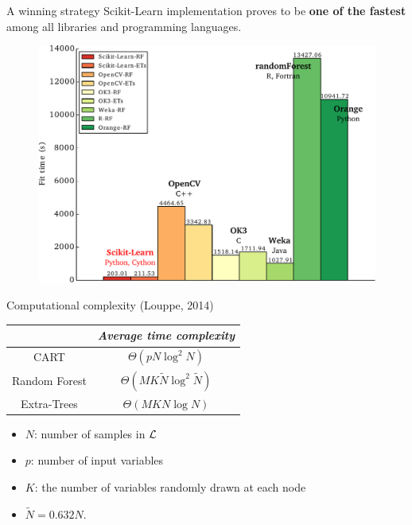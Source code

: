 \documentclass{beamer}
\begin{document}
\begin{frame}{A winning strategy}
Scikit-Learn implementation proves to be {\bf one of the fastest} among all libraries and programming languages.
  \begin{figure}
  \includegraphics[scale=0.5]{./figures/bench.pdf}
  \end{figure}
\end{frame}


\begin{frame}{Computational complexity {\scriptsize (Louppe, 2014)}}

\begin{table}
    \centering
    \begin{tabular}{| c | c |}
    \hline
         & \textit{Average time complexity}  \\
    \hline
    \hline
    CART & $\Theta(pN\log^2 N)$ \\
    Random Forest & $\Theta(MK\widetilde{N}\log^2 \widetilde{N})$  \\
    Extra-Trees & $\Theta(MKN\log N)$  \\
    \hline
    \end{tabular}
\end{table}

\begin{center}
    \begin{itemize}
    \item $N$: number of samples in ${\cal L}$
    \item $p$: number of input variables
    \item $K$: the number of variables randomly drawn at each node
    \item $\widetilde{N} = 0.632 N$.
    \end{itemize}
\end{center}

\end{frame}
\end{document}
